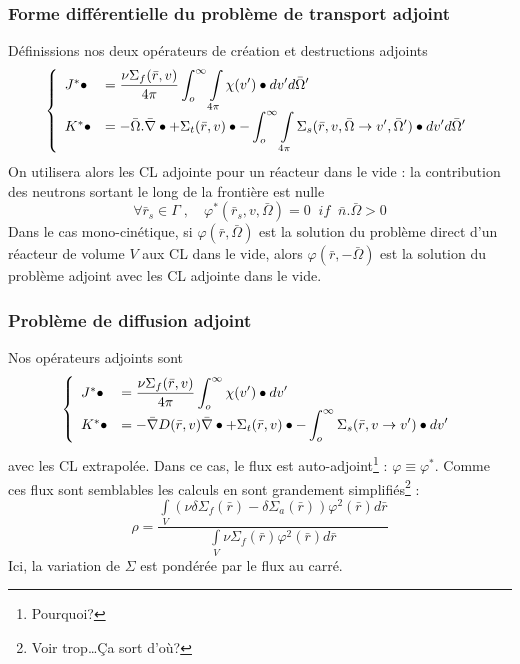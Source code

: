 		\subsubsection{Forme différentielle du problème de transport adjoint}
		Définissions nos deux opérateurs de création et destructions adjoints
		\begin{equation}
		\left\{\begin{array}{ll}
		{J^*} \bullet  &\displaystyle= \frac{{\nu {\Sigma _f}(\bar r,v)}}{{4\pi }}\int_o^\infty     \int
		\limits_{4\pi }    \chi (v') \bullet dv'd\bar \Omega '\\
		{K^*} \bullet &\displaystyle=  - \bar \Omega .\bar \nabla  \bullet  + {\Sigma _t}(\bar r,v) \bullet  -
		\int_o^\infty    \int\limits_{4\pi }   {\Sigma _s}(\bar r,v,\bar \Omega  \to v',\bar \Omega ')
		\bullet dv'd\bar \Omega '
		\end{array}\right.
		\end{equation}
		On utilisera alors les CL adjointe pour un réacteur dans le vide : la contribution des 
		neutrons sortant le long de la frontière est nulle
		\begin{equation}
		\forall {\bar r_s} \in \Gamma \;,\quad {\varphi ^*}({\bar r_s},v,\bar \Omega ) = 0\;\;if\;\;
		\bar n.\bar \Omega  > 0
		\end{equation}
		Dans le cas mono-cinétique, si $\varphi(\bar r, \bar \Omega)$ est la solution du problème 
		direct d'un réacteur de volume $V$ aux CL dans le vide, alors $\varphi(\bar r, -\bar \Omega)$
		est la solution du problème adjoint avec les CL adjointe dans le vide.
		
		\subsubsection{Problème de diffusion adjoint}
		Nos opérateurs adjoints sont
		\begin{equation}
		\left\{\begin{array}{ll}
		{J^*} \bullet  &\displaystyle= \frac{{\nu {\Sigma _f}(\bar r,v)}}{{4\pi }}\int_o^\infty   \chi (v')
		\bullet dv'\\
		{K^*} \bullet  &\displaystyle=  - \bar \nabla D(\bar r,v)\bar \nabla  \bullet  + {\Sigma _t}(\bar r,v)
		\bullet  - \int_o^\infty    {\Sigma _s}(\bar r,v \to v') \bullet dv'
		\end{array}\right.
		\end{equation}
		avec les CL extrapolée. Dans ce cas, le flux est auto-adjoint\footnote{Pourquoi?} : $\varphi
		\equiv\varphi^*$. Comme ces flux sont semblables les calculs en sont grandement 
		simplifiés\footnote{Voir trop\dots Ça sort d'où?} :
		\begin{equation}
		\rho  = \frac{{\int\limits_V    (\nu \delta {\Sigma _f}(\bar r) - \delta {\Sigma _a}(\bar r))
		{\varphi ^2}(\bar r)d\bar r}}{{\int\limits_V    \nu {\Sigma _f}(\bar r){\varphi ^2}(\bar r)d
		\bar r}}
		\end{equation}
		Ici, la variation de $\Sigma$ est pondérée par le flux au carré.
	

